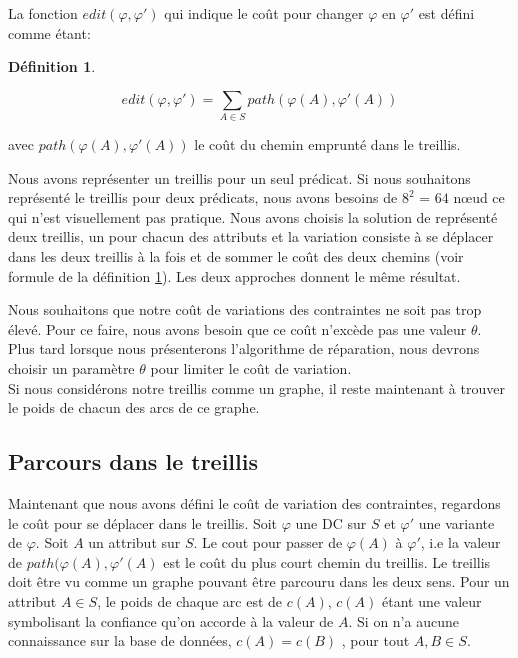 \documentclass[letterpaper, 12pt]{report}
\theoremstyle{definition}
\newtheorem{mydef}{Définition}
\begin{document}
La fonction $edit(\varphi , \varphi ')$ qui indique le coût pour changer $\varphi$ en $\varphi'$ est défini comme étant:

\begin{mydef} \label{edit}

$$
 edit(\varphi, \varphi') = \sum_{A \in S} path(\varphi(A),\varphi'(A))$$
 
avec $path(\varphi(A),\varphi'(A))$ le coût du chemin emprunté dans le treillis.
\end{mydef}

Nous avons représenter un treillis pour un seul prédicat. Si nous souhaitons représenté le treillis pour deux prédicats, nous avons besoins de $8^2$ = $64$ nœud ce qui n'est visuellement pas pratique. Nous avons choisis la solution de représenté deux treillis, un pour chacun des attributs et la variation consiste à se déplacer dans les deux treillis à la fois et de sommer le coût des deux chemins (voir formule de la définition \ref{edit}). Les deux approches donnent le même résultat.

Nous souhaitons que notre coût de variations des contraintes ne soit pas trop élevé. Pour ce faire, nous avons besoin que ce coût n'excède pas une valeur $\theta$. Plus tard lorsque nous présenterons l'algorithme de réparation, nous devrons choisir un paramètre $\theta$ pour limiter le coût de variation.\\

Si nous considérons notre treillis comme un graphe, il reste maintenant à trouver le poids de chacun des arcs de ce graphe. 

\subsection{Parcours dans le treillis}

	Maintenant que nous avons défini le coût de variation des contraintes, regardons le coût pour se déplacer dans le treillis. Soit $\varphi$ une DC sur $S$ et $\varphi'$ une variante de $\varphi$. Soit $A$ un attribut sur $S$. Le cout pour passer de $\varphi(A)$ à $\varphi'$, i.e la valeur de $path(\varphi(A),\varphi'(A)$ est le coût du plus court chemin du treillis. Le treillis doit être vu comme un graphe pouvant être parcouru dans les deux sens. Pour un attribut $A\in S$, le poids de chaque arc est de $c(A)$, $c(A)$ étant une valeur symbolisant la confiance qu'on accorde à la valeur de $A$. Si on n'a aucune connaissance sur la base de données, $c(A) =c(B)$ , pour tout $A,B \in S$.
	
\end{document}
